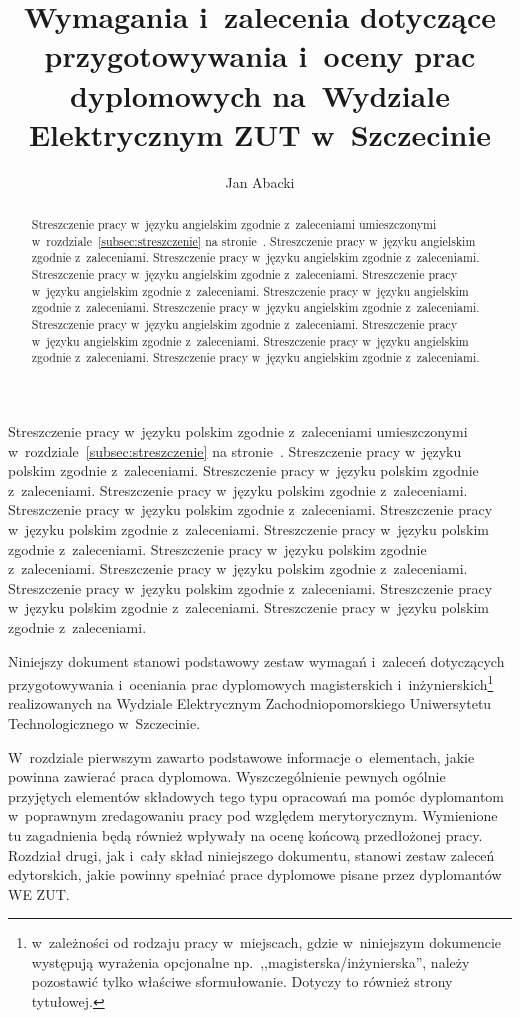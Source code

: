 \documentclass[skorowidz,skroty]{dyplomWEZUT}
\author{Jan Abacki}
\title{Wymagania i~zalecenia dotyczące przygotowywania i~oceny prac dyplomowych na~Wydziale Elektrycznym ZUT w~Szczecinie}
\begin{document}
\begin{streszczenie}
Streszczenie pracy w~języku polskim zgodnie z~zaleceniami umieszczonymi w~rozdziale~\ref{subsec:streszczenie} na stronie~\pageref{subsec:streszczenie}. Streszczenie pracy w~języku polskim zgodnie z~zaleceniami. Streszczenie pracy w~języku polskim zgodnie z~zaleceniami. Streszczenie pracy w~języku polskim zgodnie z~zaleceniami. Streszczenie pracy w~języku polskim zgodnie z~zaleceniami. Streszczenie pracy w~języku polskim zgodnie z~zaleceniami. Streszczenie pracy w~języku polskim zgodnie z~zaleceniami. Streszczenie pracy w~języku polskim zgodnie z~zaleceniami. Streszczenie pracy w~języku polskim zgodnie z~zaleceniami. Streszczenie pracy w~języku polskim zgodnie z~zaleceniami. Streszczenie pracy w~języku polskim zgodnie z~zaleceniami. Streszczenie pracy w~języku polskim zgodnie z~zaleceniami.
\end{streszczenie}

\begin{abstract}
Streszczenie pracy w~języku angielskim zgodnie z~zaleceniami umieszczonymi w~rozdziale~\ref{subsec:streszczenie} na stronie~\pageref{subsec:streszczenie}. Streszczenie pracy w~języku angielskim zgodnie z~zaleceniami. Streszczenie pracy w~języku angielskim zgodnie z~zaleceniami. Streszczenie pracy w~języku angielskim zgodnie z~zaleceniami. Streszczenie pracy w~języku angielskim zgodnie z~zaleceniami. Streszczenie pracy w~języku angielskim zgodnie z~zaleceniami. Streszczenie pracy w~języku angielskim zgodnie z~zaleceniami. Streszczenie pracy w~języku angielskim zgodnie z~zaleceniami. Streszczenie pracy w~języku angielskim zgodnie z~zaleceniami. Streszczenie pracy w~języku angielskim zgodnie z~zaleceniami. Streszczenie pracy w~języku angielskim zgodnie z~zaleceniami.
\end{abstract}

\maketitle

\begin{wprowadzenie}

Niniejszy dokument stanowi podstawowy zestaw wymagań i~zaleceń dotyczących przygotowywania i~oceniania prac dyplomowych magisterskich i~inżynierskich\footnote{w~zależności od rodzaju pracy w~miejscach, gdzie w~niniejszym dokumencie występują wyrażenia opcjonalne np.~,,magisterska/inżynierska'', należy pozostawić tylko właściwe sformułowanie. Dotyczy to również strony tytułowej.} realizowanych na Wydziale Elektrycznym Zachodniopomorskiego Uniwersytetu Technologicznego w~Szczecinie.

W~rozdziale pierwszym zawarto podstawowe informacje o~elementach, jakie powinna zawierać praca dyplomowa. Wyszczególnienie pewnych ogólnie przyjętych elementów składowych tego typu opracowań ma pomóc dyplomantom w~poprawnym zredagowaniu pracy pod względem merytorycznym. Wymienione tu zagadnienia będą również wpływały na ocenę końcową przedłożonej pracy.  Rozdział drugi, jak i~cały skład niniejszego dokumentu, stanowi zestaw zaleceń edytorskich, jakie powinny spełniać prace dyplomowe pisane przez dyplomantów WE ZUT.

\end{wprowadzenie}
\end{document}
